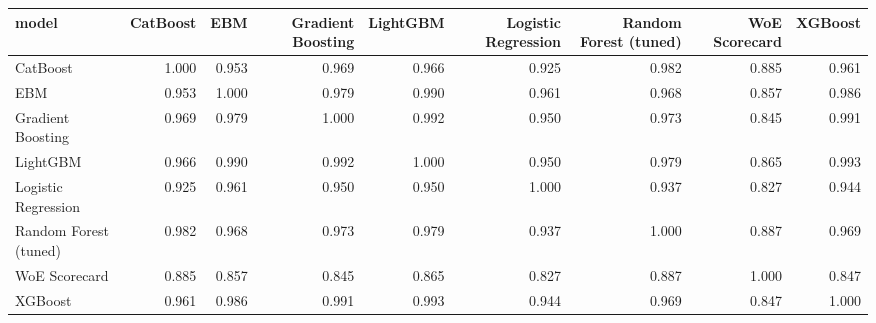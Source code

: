 \begin{tabular}{lrrrrrrrr}
\toprule
model & CatBoost & EBM & Gradient Boosting & LightGBM & Logistic Regression & Random Forest (tuned) & WoE Scorecard & XGBoost \\
\midrule
CatBoost & 1.000 & 0.953 & 0.969 & 0.966 & 0.925 & 0.982 & 0.885 & 0.961 \\
EBM & 0.953 & 1.000 & 0.979 & 0.990 & 0.961 & 0.968 & 0.857 & 0.986 \\
Gradient Boosting & 0.969 & 0.979 & 1.000 & 0.992 & 0.950 & 0.973 & 0.845 & 0.991 \\
LightGBM & 0.966 & 0.990 & 0.992 & 1.000 & 0.950 & 0.979 & 0.865 & 0.993 \\
Logistic Regression & 0.925 & 0.961 & 0.950 & 0.950 & 1.000 & 0.937 & 0.827 & 0.944 \\
Random Forest (tuned) & 0.982 & 0.968 & 0.973 & 0.979 & 0.937 & 1.000 & 0.887 & 0.969 \\
WoE Scorecard & 0.885 & 0.857 & 0.845 & 0.865 & 0.827 & 0.887 & 1.000 & 0.847 \\
XGBoost & 0.961 & 0.986 & 0.991 & 0.993 & 0.944 & 0.969 & 0.847 & 1.000 \\
\bottomrule
\end{tabular}
